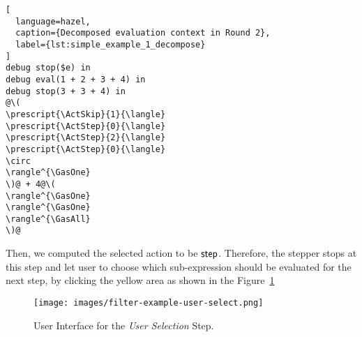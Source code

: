 \begin{lstlisting}[
  language=hazel,
  caption={Decomposed evaluation context in Round 2},
  label={lst:simple_example_1_decompose}
]
debug stop($e) in
debug eval(1 + 2 + 3 + 4) in
debug stop(3 + 3 + 4) in
@\(
\prescript{\ActSkip}{1}{\langle}
\prescript{\ActStep}{0}{\langle}
\prescript{\ActStep}{2}{\langle}
\prescript{\ActStep}{0}{\langle}
\circ
\rangle^{\GasOne}
\)@ + 4@\(
\rangle^{\GasOne}
\rangle^{\GasOne}
\rangle^{\GasAll}
\)@\end{lstlisting}

Then, we computed the selected action to be \(\mathsf{step}\). Therefore,
the stepper stops at this step and let user to choose which
sub-expression should be evaluated for the next step, by clicking the
yellow area as shown in the Figure~\ref{fig:simple_example_final_ui}

\begin{figure}[h]
  \centering
  \texttt{[image: images/filter-example-user-select.png]}
  \caption{User Interface for the \emph{User Selection} Step.}\label{fig:simple_example_final_ui}
\end{figure}





